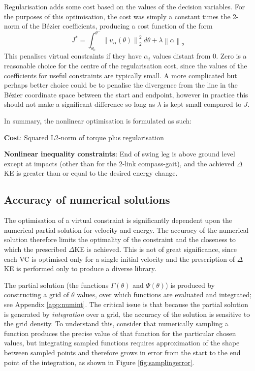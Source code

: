 Regularisation adds some cost based on the values of the decision variables. For the purposes of this optimisation, the cost was simply a constant times the 2-norm of the Bézier coefficients, producing a cost function of the form
\begin{equation} \label{eqn:regcost}
J^* = \int_{\theta_0}^{\theta^-}\left\lVert u_\alpha(\theta) \right\rVert_2^2 ~ d\theta
+ \lambda\left\lVert \alpha \right\rVert_2
\end{equation}
This penalises virtual constraints if they have $\alpha_i$ values distant from 0. Zero is a reasonable choice for the centre of the regularisation cost, since the values of the coefficients for useful constraints are typically small. A more complicated but perhaps better choice could be to penalise the divergence from the line in the Bézier coordinate space between the start and endpoint, however in practice this should not make a significant difference so long as $\lambda$ is kept small compared to $J$.

In summary, the nonlinear optimisation is formulated as such:

\textbf{Cost}: Squared L2-norm of torque plus regularisation

\textbf{Nonlinear inequality constraints}: End of swing leg is above ground level except at impacts (other than for the 2-link compass-gait), and the achieved $\Delta$KE is greater than or equal to the desired energy change.

\subsection{Accuracy of numerical solutions} \label{sec:numsolacc}
The optimisation of a virtual constraint is significantly dependent upon the numerical partial solution for velocity and energy. The accuracy of the numerical solution therefore limits the optimality of the constraint and the closeness to which the prescribed $\Delta$KE is achieved. This is not of great significance, since each VC is optimised only for a single initial velocity and the prescription of $\Delta$KE is performed only to produce a diverse library.

The partial solution (the functions $\Gamma(\theta)$ and $\Psi(\theta)$) is produced by constructing a grid of $\theta$ values, over which functions are evaluated and integrated; see Appendix \ref{app:numint}. The critical issue is that because the partial solution is generated by \textit{integration} over a grid, the accuracy of the solution is sensitive to the grid density. To understand this, consider that numerically sampling a function produces the precise value of that function for the particular chosen values, but integrating sampled functions requires approximation of the shape between sampled points and therefore grows in error from the start to the end point of the integration, as shown in Figure \ref{fig:samplingerror}.


